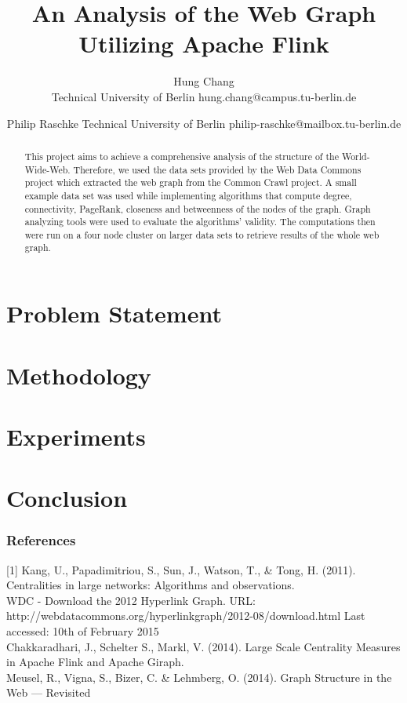 \documentclass{article} %
\title{An Analysis of the Web Graph Utilizing Apache Flink}
\author{
Hung Chang \\
Technical University of Berlin
hung.chang@campus.tu-berlin.de
\and
Philip Raschke
Technical University of Berlin
philip-raschke@mailbox.tu-berlin.de
}
\begin{document}
\maketitle

\begin{abstract}
This project aims to achieve a comprehensive analysis of the structure of the World-Wide-Web. Therefore, we used the data sets provided by the Web Data Commons project which extracted the web graph from the Common Crawl project. A small example data set was used while implementing algorithms that compute degree, connectivity, PageRank, closeness and betweenness of the nodes of the graph. Graph analyzing tools were used to evaluate the algorithms' validity. The computations then were run on a four node cluster on larger data sets to retrieve results of the whole web graph.
\end{abstract}

\section{Problem Statement}


\section{Methodology}


\section{Experiments}


\section{Conclusion}


\subsubsection*{References}

\small{
	[1] Kang, U., Papadimitriou, S., Sun, J., Watson, T., \& Tong, H. (2011). Centralities in large networks: Algorithms and observations. \\ \relax
	[2] WDC - Download the 2012 Hyperlink Graph. URL: http://webdatacommons.org/hyperlinkgraph/2012-08/download.html Last accessed: 10th of February 2015 \\ \relax
	[3] Chakkaradhari, J., Schelter S., Markl, V. (2014). Large Scale Centrality Measures in Apache Flink and Apache Giraph. \\ \relax
	[4] Meusel, R., Vigna, S., Bizer, C. \& Lehmberg, O. (2014). Graph Structure in the Web — Revisited \\ \relax
}
\end{document}
